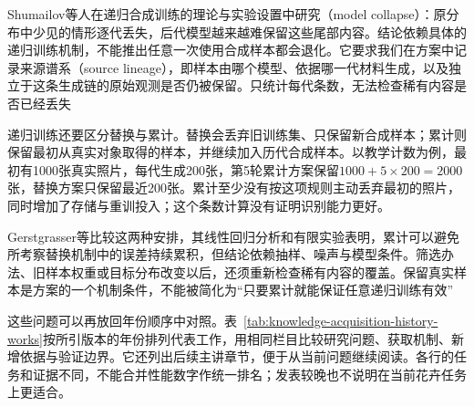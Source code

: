 Shumailov等人在递归合成训练的理论与实验设置中研究（model collapse）：原分布中少见的情形逐代丢失，后代模型越来越难保留这些尾部内容。结论依赖具体的递归训练机制，不能推出任意一次使用合成样本都会退化。它要求我们在方案中记录来源谱系（source lineage），即样本由哪个模型、依据哪一代材料生成，以及独立于这条生成链的原始观测是否仍被保留。只统计每代条数，无法检查稀有内容是否已经丢失

递归训练还要区分替换与累计。替换会丢弃旧训练集、只保留新合成样本；累计则保留最初从真实对象取得的样本，并继续加入历代合成样本。以教学计数为例，最初有1000张真实照片，每代生成200张，第5轮累计方案保留$1000+5\times200=2000$张，替换方案只保留最近200张。累计至少没有按这项规则主动丢弃最初的照片，同时增加了存储与重训投入；这个条数计算没有证明识别能力更好。

Gerstgrasser等比较这两种安排，其线性回归分析和有限实验表明，累计可以避免所考察替换机制中的误差持续累积，但结论依赖抽样、噪声与模型条件。筛选办法、旧样本权重或目标分布改变以后，还须重新检查稀有内容的覆盖。保留真实样本是方案的一个机制条件，不能被简化为“只要累计就能保证任意递归训练有效”

这些问题可以再放回年份顺序中对照。表~\ref{tab:knowledge-acquisition-history-works}按所引版本的年份排列代表工作，用相同栏目比较研究问题、获取机制、新增依据与验证边界。它还列出后续主讲章节，便于从当前问题继续阅读。各行的任务和证据不同，不能合并性能数字作统一排名；发表较晚也不说明在当前花卉任务上更适合。

